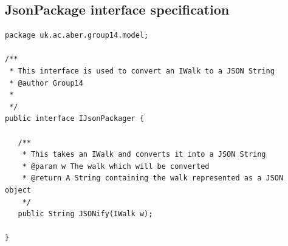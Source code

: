 \documentclass{project}
\begin{document}
\subsection{JsonPackage interface specification}
\begin{verbatim}
package uk.ac.aber.group14.model;

/**
 * This interface is used to convert an IWalk to a JSON String
 * @author Group14
 *
 */
public interface IJsonPackager {
   
   /**
    * This takes an IWalk and converts it into a JSON String
    * @param w The walk which will be converted
    * @return A String containing the walk represented as a JSON object
    */
   public String JSONify(IWalk w);
   
}
\end{verbatim}

\newpage
\end{document}
